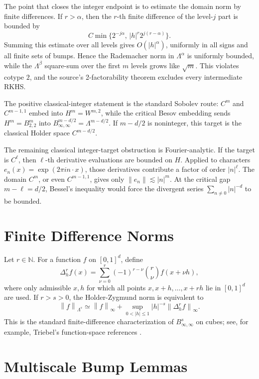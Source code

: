\documentclass[11pt]{article}
\newcommand{\N}{\mathbb{N}}
\newcommand{\Lam}{\Lambda}
\newcommand{\norm}[1]{\left\lVert #1\right\rVert}
\newcommand{\abs}[1]{\left\lvert #1\right\rvert}
\begin{document}
The point that closes the integer endpoint is to estimate the domain norm by
finite differences. If \(r>\alpha\), then the \(r\)-th finite difference of
the level-\(j\) part is bounded by
\[
  C\min\{2^{-j\alpha},\, |h|^r2^{j(r-\alpha)}\}.
\]
Summing this estimate over all levels gives \(O(|h|^\alpha)\), uniformly in
all signs and all finite sets of bumps. Hence the Rademacher norm in
\(\Lam^\alpha\) is uniformly bounded, while the \(\Lam^\beta\) square-sum
over the first \(m\) levels grows like \(\sqrt m\). This violates cotype
\(2\), and the source's 2-factorability theorem excludes every intermediate
RKHS.

The positive classical-integer statement is the standard Sobolev route:
\(C^m\) and \(C^{m-1,1}\) embed into \(H^m=W^{m,2}\), while the critical
Besov embedding sends \(H^m=B^m_{2,2}\) into
\(B^{m-d/2}_{\infty,\infty}=\Lam^{m-d/2}\). If \(m-d/2\) is noninteger,
this target is the classical Holder space \(C^{m-d/2}\).

The remaining classical integer-target obstruction is Fourier-analytic. If
the target is \(C^\ell\), then \(\ell\)-th derivative evaluations are bounded
on \(H\). Applied to characters \(e_n(x)=\exp(2\pi i n\cdot x)\), those
derivatives contribute a factor of order \(|n|^\ell\). The domain
\(C^m\), or even \(C^{m-1,1}\), gives only \(\|e_n\|\lesssim |n|^m\). At the
critical gap \(m-\ell=d/2\), Bessel's inequality would force the divergent
series \(\sum_{n\ne0}|n|^{-d}\) to be bounded.

\section*{Finite Difference Norms}

Let \(r\in\N\). For a function \(f\) on \([0,1]^d\), define
\[
  \Delta_h^r f(x)
  =
  \sum_{\nu=0}^r(-1)^{r-\nu}\binom r\nu f(x+\nu h),
\]
where only admissible \(x,h\) for which all points
\(x,x+h,\ldots,x+rh\) lie in \([0,1]^d\) are used. If \(r>s>0\), the
Holder-Zygmund norm is equivalent to
\[
  \norm{f}_{\Lam^s}
  \simeq
  \norm{f}_{\infty}
  +\sup_{0<\abs h\le1}\abs h^{-s}
    \norm{\Delta_h^r f}_{\infty}.
\]
This is the standard finite-difference characterization of
\(B^s_{\infty,\infty}\) on cubes; see, for example, Triebel's function-space
references \cite{Triebel83}.

\section*{Multiscale Bump Lemmas}
\end{document}
